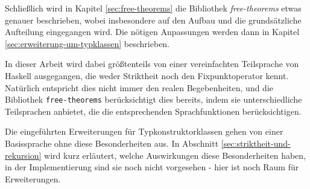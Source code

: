 

Schließlich wird in Kapitel \ref{sec:free-theorems} die Bibliothek \textit{free-theorems} etwas genauer beschrieben, wobei
insbesondere auf den Aufbau und die grundsätzliche Aufteilung eingegangen wird. Die nötigen Anpassungen werden
dann in Kapitel \ref{sec:erweiterung-um-typklassen} beschrieben.

In dieser Arbeit wird dabei größtenteils von einer vereinfachten Teilsprache von Haskell ausgegangen, die weder Striktheit noch
den Fixpunktoperator kennt. Natürlich entspricht dies nicht immer den realen Begebenheiten, und die Bibliothek
\texttt{free-theorems} berücksichtigt dies bereits, indem sie unterschiedliche Teilsprachen anbietet, die die entsprechenden
Sprachfunktionen berücksichtigen.

Die eingeführten Erweiterungen für Typkonstruktorklassen gehen von einer Basissprache ohne diese Besonderheiten aus.
In Abschnitt \ref{sec:striktheit-und-rekursion} wird kurz erläutert, welche Auswirkungen diese Besonderheiten haben, in der
Implementierung sind sie noch nicht vorgesehen - hier ist noch Raum für Erweiterungen. 